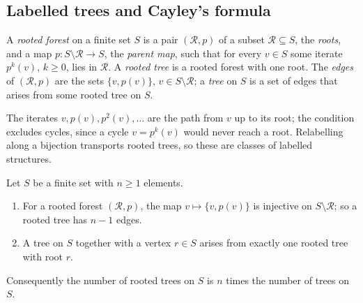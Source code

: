 \subsection{Labelled trees and Cayley's formula}\label{generating-functions:subsection-cayley}

\begin{definition}\label{generating-functions:definition-rooted-tree}
A \emph{rooted forest} on a finite set $S$ is a pair $(\mathcal{R}, p)$ of a subset $\mathcal{R} \subseteq S$, the \emph{roots}, and a map $p \colon S \setminus \mathcal{R} \to S$, the \emph{parent
map}, such that for every $v \in S$ some iterate $p^k(v)$, $k \geq 0$, lies in $\mathcal{R}$. A \emph{rooted tree} is a rooted forest with one root. The \emph{edges} of $(\mathcal{R}, p)$ are the
sets $\{v, p(v)\}$, $v \in S \setminus \mathcal{R}$; a \emph{tree} on $S$ is a set of edges that arises from some rooted tree on $S$.
\end{definition}

The iterates $v, p(v), p^2(v), \ldots$ are the path from $v$ up to its root; the condition excludes cycles, since a cycle $v = p^k(v)$ would never reach a root. Relabelling along a bijection
transports rooted trees, so these are classes of labelled structures.

\begin{lemma}\label{generating-functions:lemma-trees-roots}
Let $S$ be a finite set with $n \geq 1$ elements.
\begin{enumerate}
\item For a rooted forest $(\mathcal{R}, p)$, the map $v \mapsto \{v, p(v)\}$ is injective on $S \setminus \mathcal{R}$; so a rooted tree has $n - 1$ edges.
\item A tree on $S$ together with a vertex $r \in S$ arises from exactly one rooted tree with root $r$.
\end{enumerate}
Consequently the number of rooted trees on $S$ is $n$ times the number of trees on $S$.
\end{lemma}

